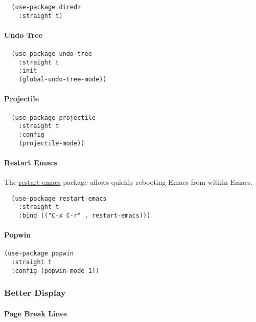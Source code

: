 \documentclass[11pt]{article}
\begin{document}
\begin{verbatim}
  (use-package dired+
    :straight t)
\end{verbatim}

\paragraph*{Undo Tree}
\label{sec:org05eb28a}

\begin{verbatim}
  (use-package undo-tree
    :straight t
    :init
    (global-undo-tree-mode))
\end{verbatim}

\paragraph*{Projectile}
\label{sec:org23de8c6}

\begin{verbatim}
  (use-package projectile
    :straight t
    :config
    (projectile-mode))
\end{verbatim}

\paragraph*{Restart Emacs}
\label{sec:orgf45ed26}

The \href{https://github.com/iqbalansari/restart-emacs}{restart-emacs} package allows quickly rebooting Emacs
from within Emacs.

\begin{verbatim}
  (use-package restart-emacs
    :straight t
    :bind (("C-x C-r" . restart-emacs)))
\end{verbatim}

\paragraph*{Popwin}
\label{sec:org3d05537}

\begin{verbatim}
(use-package popwin
  :straight t
  :config (popwin-mode 1))
\end{verbatim}

\subsubsection*{Better Display}
\label{sec:org2d5f6cc}
\paragraph*{Page Break Lines}
\label{sec:orgafc7128}
\end{document}
